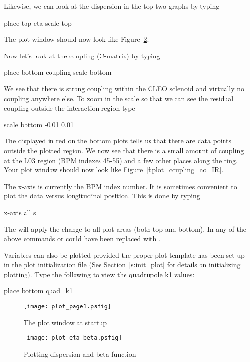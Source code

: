 Likewise, we can look at the dispersion in the top two graphs by
typing
\begin{example}
  place top eta
  scale top
\end{example}
The plot window should now look like Figure~\ref{f:plot_eta_beta}.

Now let's look at the coupling (C-matrix) by typing
\begin{example}
  place bottom coupling
  scale bottom
\end{example}
We see that there is strong coupling within the CLEO solenoid and
virtually no coupling anywhere else. To zoom in the scale so that we
can see the residual coupling outside the interaction region type
\begin{example}
  scale bottom -0.01 0.01
\end{example}
The  displayed in red on the bottom plots tells us
that there are data points outside the plotted region.  We now see that
there is a small amount of coupling at the L03 region (BPM indexes
45-55) and a few other places along the ring. Your plot window should
now look like Figure~\ref{f:plot_coupling_no_IR}.

The x-axis is currently the BPM index number. It is sometimes
convenient to plot the data versus longitudinal position. This is done
by typing
\begin{example}
  x-axis all s
\end{example}

The  will apply the change to all plot areas (both top and
bottom). In any of the above commands  or  could
have been replaced with .

Variables can also be plotted provided the proper plot template has
been set up in the plot initialization file (See
Section~\ref{s:init_plot} for details on initializing plotting). Type
the following to view the quadrupole k1 values:
\begin{example}
  place bottom quad_k1
\end{example}

\begin{figure}
  \centering
  \texttt{[image: plot\_page1.psfig]}
  \caption{The plot window at startup}
  \label{f:plot_begin}
\end{figure}

\begin{figure}
  \centering
  \texttt{[image: plot\_eta\_beta.psfig]}
  \caption{Plotting dispersion and beta function}
  \label{f:plot_eta_beta}
\end{figure}


